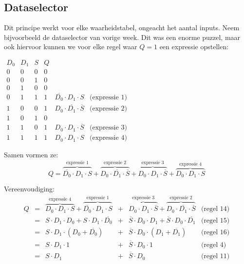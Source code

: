 \documentclass[11pt,a5paper]{report}
\begin{document}
\newpage
\subsection*{Dataselector}

\begin{minipage}[t]{0.35\textwidth}
Dit principe werkt voor elke waarheidstabel, ongeacht het aantal inputs. Neem bijvoorbeeld de dataselector van vorige week. Dit was een enorme puzzel, maar ook hiervoor kunnen we voor elke regel waar $Q = 1$ een expressie opstellen:
\end{minipage}%
\hfill
\begin{minipage}[t]{0.58\textwidth}
\vspace*{-1em}
\(
\begin{array}{ccc|c||ll}
D_0 & D_1 & S & Q \\
\hline
0 & 0 & 0 & 0 \\
0 & 0 & 1 & 0 \\
0 & 1 & 0 & 0 \\
0 & 1 & 1 & 1 & \overline{D_0} \cdot D_1 \cdot S & \text{(expressie 1)}\\
1 & 0 & 0 & 1 & D_0 \cdot \overline{D_1} \cdot \overline{S} & \text{(expressie 2)}\\
1 & 0 & 1 & 0 \\
1 & 1 & 0 & 1 & D_0 \cdot D_1 \cdot \overline{S}& \text{(expressie 3)}\\
1 & 1 & 1 & 1 & D_0 \cdot D_1 \cdot S & \text{(expressie 4)}
\end{array}
\)
\end{minipage}






Samen vormen ze:
\[
Q = \overbrace{\overline{D_0} \cdot D_1 \cdot S}^\text{expressie 1}  + \overbrace{D_0 \cdot \overline{D_1} \cdot \overline{S}}^\text{expressie 2} + \overbrace{D_0 \cdot D_1 \cdot \overline{S}}^\text{expressie 3} + \overbrace{D_0 \cdot D_1 \cdot S}^\text{expressie 4}
\]

Vereenvoudiging:
\[
\begin{array}{rcrcll}
Q &=& \overbrace{D_0 \cdot D_1 \cdot S}^\text{expressie 4} + \overbrace{\overline{D_0} \cdot D_1 \cdot S}^\text{expressie 1} & + &  \overbrace{D_0 \cdot D_1 \cdot \overline{S}}^\text{expressie 3} +  \overbrace{D_0 \cdot \overline{D_1} \cdot \overline{S}}^\text{expressie 2} &\text{(regel 14)}\\
  &=& S \cdot D_1 \cdot D_0 + S \cdot D_1 \cdot \overline{D_0}  & + &  \overline{S} \cdot D_0 \cdot D_1 +   \overline{S} \cdot D_0 \cdot \overline{D_1} &\text{(regel 15)}\\
  &=& S \cdot D_1 \cdot (D_0 + \overline{D_0})  & + &  \overline{S} \cdot D_0 \cdot (D_1 + \overline{D_1}) &\text{(regel 16)}\\
  &=& S \cdot D_1 \cdot 1 & + &  \overline{S} \cdot D_0 \cdot 1 &\text{(regel 4)}\\
  &=& S \cdot D_1 & + &  \overline{S} \cdot D_0 &\text{(regel 11)}\\
  
\end{array}
\]
\end{document}
